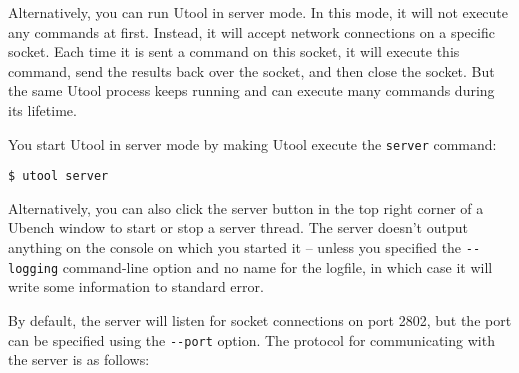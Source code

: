 Alternatively, you can run Utool in server mode. In this mode, it will
not execute any commands at first. Instead, it will accept network
connections on a specific socket. Each time it is sent a command on
this socket, it will execute this command, send the results back over
the socket, and then close the socket. But the same Utool process
keeps running and can execute many commands during its lifetime. 

You start Utool in server mode by making Utool execute the
\verb?server? command:

\begin{verbatim}
$ utool server
\end{verbatim}

Alternatively, you can also click the server button in the top right corner of a Ubench window to start or stop a server thread. The server doesn't output anything on the console on which you started
it -- unless you specified the \verb?--logging? command-line option
and no name for the logfile, in which case it will write some
information to standard error. 

By default, the server will listen for socket connections on port
2802, but the port can be specified using the \verb?--port?
option. The protocol for communicating with the server is as follows:


